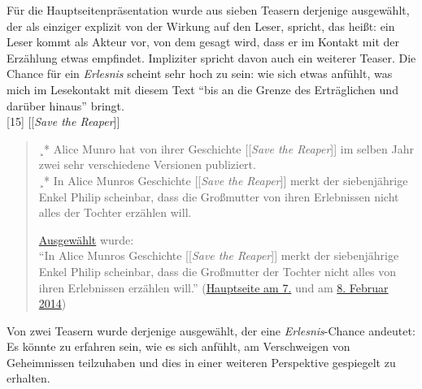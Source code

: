 \documentclass[fontsize=12pt]{scrartcl}
\begin{document}
F\"ur die Hauptsei\-tenpr\"asentation wurde aus sieben Teasern derjenige ausgew\"ahlt, der als einziger explizit von der Wirkung auf den Leser\textsuperscript{\tiny *}, spricht, das hei{\ss}t: ein Leser\textsuperscript{\tiny *} kommt als Akteur\textsuperscript{\tiny *} vor, von dem gesagt wird, dass er im Kontakt mit der Erz\"ahlung etwas empfindet. Impliziter spricht davon auch ein weiterer Teaser. Die Chance f\"ur ein \textit{Erlesnis} scheint sehr hoch zu sein: wie sich etwas anf\"uhlt, was mich im Lesekontakt mit diesem Text "`bis an die Grenze des Ertr\"aglichen und dar\"uber hinaus"' bringt.\\

[15] [[\textit{Save the Reaper}]]
\singlespacing
\begin{quote}
¸* Alice Munro hat von ihrer Geschichte [[\textit{Save the Reaper}]] im selben Jahr zwei sehr verschiedene Versionen pu\-bli\-ziert.\\
¸* In Alice Munros Geschichte [[\textit{Save the Reaper}]] merkt der siebenj\"ahrige Enkel Philip scheinbar, dass die Gro{\ss}mutter von ihren Erlebnissen nicht alles der Tochter erz\"ahlen will.

\href{https://de.wikipedia.org/wiki/Wikipedia_Diskussion:Hauptseite/Schon_gewusst/Diskussionsarchiv/2014/Januar#Eigenvorschlag:_Save_the_Reaper_.284._Januar_2014.29_.28erl..29}{Ausgew\"ahlt} wurde:\\
"`In Alice Munros Geschichte [[\textit{Save the Reaper}]] merkt der siebenj\"ahrige Enkel Philip scheinbar, dass die Gro{\ss}mutter der Tochter nicht alles von ihren Erlebnissen erz\"ahlen will."' (\href{https://de.wikipedia.org/wiki/Wikipedia:Hauptseite/Archiv/7._Februar_2014}{Hauptseite am 7.} und am \href{https://de.wikipedia.org/wiki/Wikipedia:Hauptseite/Archiv/8._Februar_2014}{8. Februar 2014})
\end{quote}
\onehalfspacing

Von zwei Teasern wurde derjenige ausgew\"ahlt, der eine \textit{Erlesnis}-Chance andeutet: Es k\"onnte zu erfahren sein, wie es sich anf\"uhlt, am Verschweigen von Geheimnissen teilzuhaben und dies in einer weiteren Perspektive gespiegelt zu erhalten.\\ 
\end{document}
